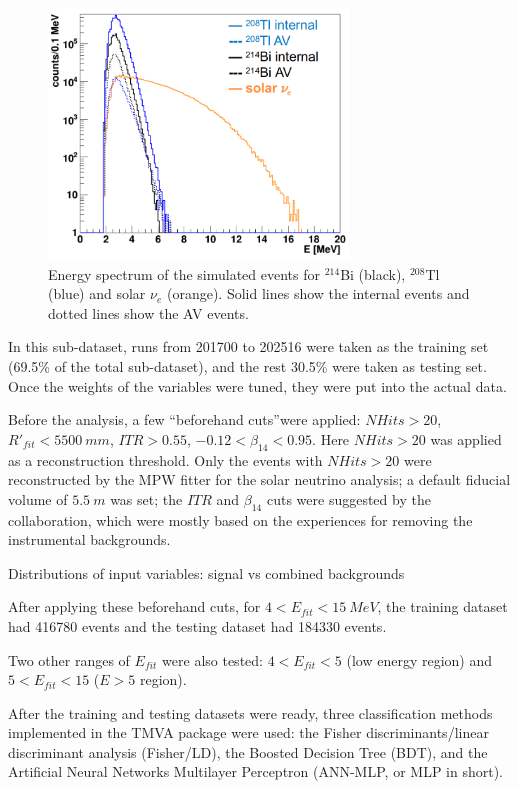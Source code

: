 \begin{figure}[!htb]
	\centering
	\includegraphics[width=8cm]{TMVA_bkgs_1.png}
	\caption{Energy spectrum of the simulated events for $^{214}$Bi (black), $^{208}$Tl (blue) and solar $\nu_e$ (orange). Solid lines show the internal events and dotted lines show the AV events.}
	\label{TMVA_bkgs_1}
\end{figure}

In this sub-dataset, runs from 201700 to 202516 were taken as the training set (69.5\% of the total sub-dataset), and the rest 30.5\% were taken as testing set. Once the weights of the variables were tuned, they were put into the actual data.

Before the analysis, a few ``beforehand cuts''were applied: $NHits>20$, $R'_{fit}<5500~mm$, $ITR>0.55$, $-0.12<\beta_{14}<0.95$. Here $NHits>20$ was applied as a reconstruction threshold. Only the events with $NHits>20$ were reconstructed by the MPW fitter for the solar neutrino analysis; a default fiducial volume of $5.5~m$ was set; the $ITR$ and $\beta_{14}$ cuts were suggested by the collaboration, which were mostly based on the experiences for removing the instrumental backgrounds\cite{waterunidoc}. 

Distributions of input variables:
signal vs combined backgrounds


After applying these beforehand cuts, for $4<E_{fit}<15~MeV$, the training dataset had 416780 events and the testing dataset had 184330 events.

Two other ranges of $E_{fit}$ were also tested: $4<E_{fit}<5$ (low energy region) and $5<E_{fit}<15$ ($E>5$ region). %

After the training and testing datasets were ready, three classification methods implemented in the TMVA package were used: the Fisher discriminants/linear discriminant analysis (Fisher/LD), the Boosted Decision Tree (BDT), and the Artificial Neural Networks Multilayer Perceptron (ANN-MLP, or MLP in short)\cite{albertsson2007tmva}.

